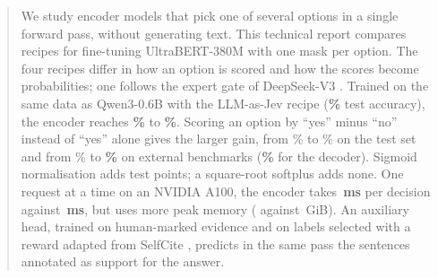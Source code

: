 \begin{abstract}
We study encoder models that pick one of several options in a single forward pass, without generating text.
This technical report compares recipes for fine-tuning UltraBERT-380M \citep{ultrabert} with one mask per option.
The four recipes differ in how an option is scored and how the scores become probabilities; one follows the expert gate of DeepSeek-V3 \citep{deepseekv3}.
Trained on the same data as Qwen3-0.6B with the LLM-as-Jev recipe \citep{li2026llmasjev} (\textbf{\TestQwFull{}\%} test accuracy), the encoder reaches \textbf{\TestUbList{}\%} to \textbf{\TestUbSig{}\%}.
Scoring an option by ``yes'' minus ``no'' instead of ``yes'' alone gives the larger gain, from \TestUbList{}\% to \TestUbYesNo{}\% on the test set and from \ExtUbList{}\% to \textbf{\ExtUbYesNo{}\%} on external benchmarks (\textbf{\ExtQwFull{}\%} for the decoder).
Sigmoid normalisation adds \DiffUbSigUbYesNoAbs{} test points; a square-root softplus adds none.
One request at a time on an NVIDIA A100, the encoder takes \textbf{\MsUb{}\,ms} per decision against \textbf{\MsQwFull{}\,ms}, but uses more peak memory (\MemPeakUb{} against \MemPeakQwFull{}\,GiB).
An auxiliary head, trained on human-marked evidence and on labels selected with a reward adapted from SelfCite \citep{selfcite}, predicts in the same pass the sentences annotated as support for the answer.
\end{abstract}
